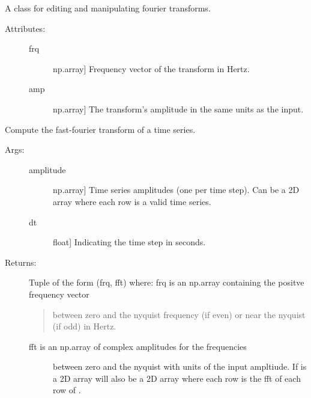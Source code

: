 \documentclass[letterpaper,10pt,english]{sphinxmanual}
\begin{document}

\begin{fulllineitems}
\label{\detokenize{index:sigpropy.FourierTransform}}
A class for editing and manipulating fourier transforms.
\begin{description}
\item[{Attributes:}] \leavevmode\begin{description}
\item[{frq}] \leavevmode{[}np.array{]}
Frequency vector of the transform in Hertz.

\item[{amp}] \leavevmode{[}np.array{]}
The transform’s amplitude in the same units as the input.

\end{description}

\end{description}

\begin{fulllineitems}
\label{\detokenize{index:sigpropy.FourierTransform.fft}}
Compute the fast-fourier transform of a time series.
\begin{description}
\item[{Args:}] \leavevmode\begin{description}
\item[{amplitude}] \leavevmode{[}np.array{]}
Time series amplitudes (one per time step). Can be a 2D
array where each row is a valid time series.

\item[{dt}] \leavevmode{[}float{]}
Indicating the time step in seconds.

\end{description}

\item[{Returns:}] \leavevmode
Tuple of the form (frq, fft) where:
frq is an np.array containing the positve frequency vector
\begin{quote}

between zero and the nyquist frequency (if even) or near
the nyquist (if odd) in Hertz.
\end{quote}
\begin{description}
\item[{fft is an np.array of complex amplitudes for the frequencies}] \leavevmode
between zero and the nyquist with units of the input 
ampltiude. If  is a 2D array  will also 
be a 2D array where each row is the fft of each row of
.


\end{description}
\end{description}
\end{fulllineitems}
\end{fulllineitems}
\end{document}
